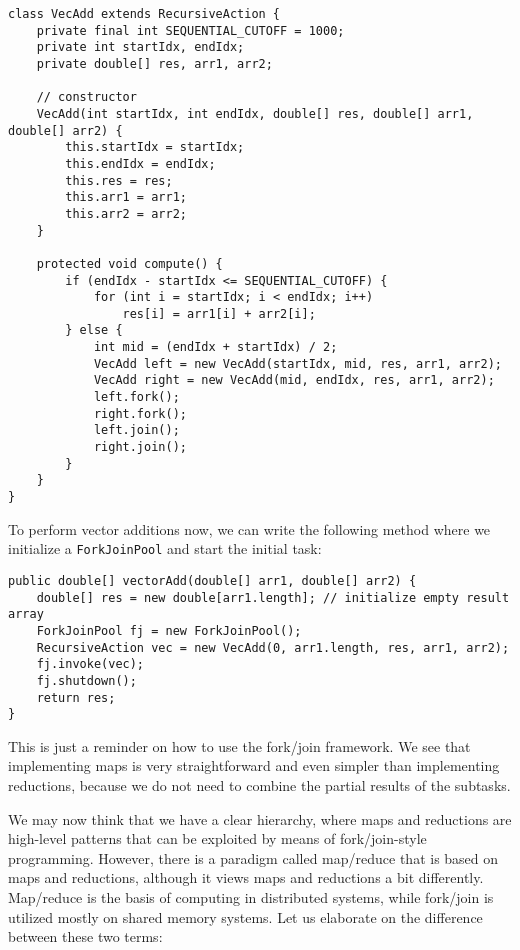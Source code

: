 \documentclass[main.tex]{subfiles}
\begin{document}
\begin{verbatim}
class VecAdd extends RecursiveAction {
    private final int SEQUENTIAL_CUTOFF = 1000;
    private int startIdx, endIdx;
    private double[] res, arr1, arr2;

    // constructor
    VecAdd(int startIdx, int endIdx, double[] res, double[] arr1, double[] arr2) {
        this.startIdx = startIdx;
        this.endIdx = endIdx;
        this.res = res;
        this.arr1 = arr1;
        this.arr2 = arr2;
    }

    protected void compute() {
        if (endIdx - startIdx <= SEQUENTIAL_CUTOFF) {
            for (int i = startIdx; i < endIdx; i++)
                res[i] = arr1[i] + arr2[i];
        } else {
            int mid = (endIdx + startIdx) / 2;
            VecAdd left = new VecAdd(startIdx, mid, res, arr1, arr2);
            VecAdd right = new VecAdd(mid, endIdx, res, arr1, arr2);
            left.fork();
            right.fork();
            left.join();
            right.join();
        }
    }
}
\end{verbatim}

\noindent To perform vector additions now, we can write the following method where we initialize a \texttt{ForkJoinPool} and start the initial task:

\begin{verbatim}
public double[] vectorAdd(double[] arr1, double[] arr2) {
    double[] res = new double[arr1.length]; // initialize empty result array
    ForkJoinPool fj = new ForkJoinPool();
    RecursiveAction vec = new VecAdd(0, arr1.length, res, arr1, arr2);
    fj.invoke(vec);
    fj.shutdown();
    return res;
}
\end{verbatim}

\noindent This is just a reminder on how to use the fork/join framework. We see that implementing maps is very straightforward and even simpler than implementing reductions, because we do not need to combine the partial results of the subtasks.

We may now think that we have a clear hierarchy, where maps and reductions are high-level patterns that can be exploited by means of fork/join-style programming. However, there is a paradigm called map/reduce that is based on maps and reductions, although it views maps and reductions a bit differently. Map/reduce is the basis of computing in distributed systems, while fork/join is utilized mostly on shared memory systems. Let us elaborate on the difference between these two terms:
\end{document}
